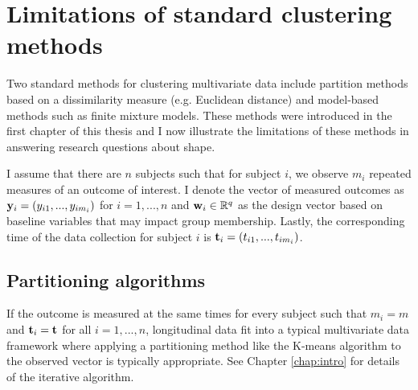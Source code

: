 \section{Limitations of standard clustering methods}
Two standard methods for clustering multivariate data include partition methods based on a dissimilarity measure (e.g. Euclidean distance) and model-based methods such as finite mixture models. These methods were introduced in the first chapter of this thesis and I now illustrate the limitations of these methods in answering research questions about shape. 

I assume that there are $n$ subjects such that for subject $i$, we observe $m_{i}$ repeated measures of an outcome of interest. I denote the vector of measured outcomes as $\mathbf y_{i}=(y_{i1},...,y_{im_{i}})$ for $i=1,...,n$ and $\mathbf w_{i}\in \mathbb{R}^{q}$ as the design vector based on baseline variables that may impact group membership. Lastly, the corresponding time of the data collection for subject $i$ is $\mathbf t_{i}=(t_{i1},...,t_{im_{i}})$. 

\subsection{Partitioning algorithms}
If the outcome is measured at the same times for every subject such that $m_{i}=m$ and $\mathbf t_{i}=\mathbf t$ for all $i=1,...,n$, longitudinal data fit into a typical multivariate data framework where applying a partitioning method like the K-means algorithm \cite{macqueen1967, hartigan1979} to the observed vector is typically appropriate. See Chapter \ref{chap:intro} for details of the iterative algorithm.

